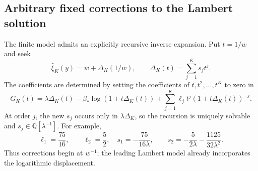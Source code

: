 \documentclass[11pt,letterpaper]{article}
\numberwithin{equation}{section}
\theoremstyle{definition}
\newcommand{\Q}{\mathbb Q}
\newcommand{\1}{\mathbf 1}
\begin{document}
\subsection{Arbitrary fixed corrections to the Lambert solution}
The finite model admits an explicitly recursive inverse expansion. Put
$t=1/w$ and seek
\begin{equation}
 \widehat\xi_K(y)=w+\Delta_K(1/w),\qquad
 \Delta_K(t)=\sum_{j=1}^Ks_jt^j.
 \label{shr:h4:eq:xihat}
\end{equation}
The coefficients are determined by setting the coefficients of
$t,t^2,\ldots,t^K$ to zero in
\begin{equation}
 G_K(t)=\lambda\Delta_K(t)
 -\beta_*\log(1+t\Delta_K(t))
 +\sum_{j=1}^K\ell_jt^j(1+t\Delta_K(t))^{-j}.
 \label{shr:h4:eq:Ginverse}
\end{equation}
At order $j$, the new $s_j$ occurs only in $\lambda\Delta_K$,
so the recursion is uniquely solvable and
$s_j\in\Q[\lambda^{-1}]$. For example,
\begin{equation}
 \ell_1=\frac{75}{16},\qquad \ell_2=\frac52,
 \quad
 s_1=-\frac{75}{16\lambda},\qquad
 s_2=-\frac5{2\lambda}-\frac{1125}{32\lambda^2}.
 \label{shr:h4:eq:firstinverse}
\end{equation}
Thus corrections begin at $w^{-1}$; the leading Lambert model already
incorporates the logarithmic displacement.
\end{document}
